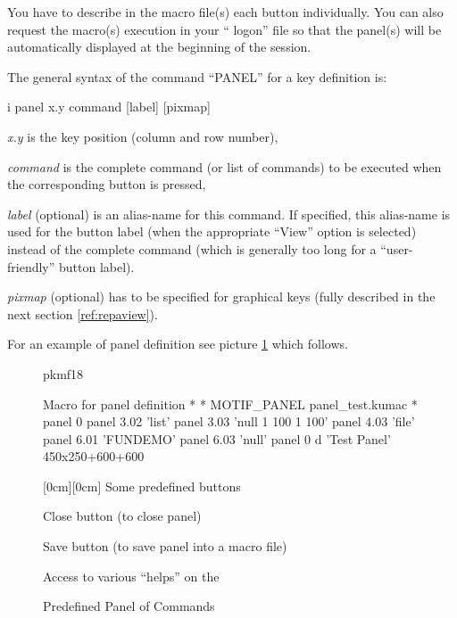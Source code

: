 You have to describe in the \KUIP{} macro file(s) each button
individually.  You can also request
the macro(s) execution in your ``\KUIP{} logon'' file
so that the panel(s) will be automatically displayed at the beginning
of the session.
 
The general syntax of the \KUIPMotif{} command ``PANEL''
for a key definition is:
 
\begin{Gray}{i}
 panel x.y command [label] [pixmap]
\end{Gray}
 
\begin{UL}
\item {\it x.y} is the key position (column and row number),
\item {\it command} is the complete command (or list of commands) to
be executed when the corresponding button is pressed,
\item  {\it label} (optional) is an alias-name for this command.
If specified, this alias-name is used for the button label
(when the appropriate ``View'' option is selected) instead of the
complete command (which is generally too long for a ``user-friendly''
button label).
\item {\it pixmap} (optional) has to be specified
for graphical keys (fully described in the next section \ref{ref:repaview}).
\end{UL}
 
For an example of panel definition see picture \ref{ref:FIGPKMF18}
which follows.
 
\begin{figure}[htb]
\begin{PICTf}[.45]{pkmf18}
\begin{DLsf}{}
\begin{XMPt}{\KUIP{} Macro for panel definition}\footnotesize
*
* MOTIF_PANEL panel_test.kumac
*
panel 0
panel 3.02 'list'
panel 3.03 'null 1 100 1 100'
panel 4.03 'file'
panel 6.01 'FUNDEMO'
panel 6.03 'null'
panel 0 d 'Test Panel' 450x250+600+600
\end{XMPt}
\end{DLsf}
\end{PICTf}
\begin{EnumZW}
\item \raisebox{-2pt}[0cm][0cm]{\Large{} }
Some predefined buttons
\end{EnumZW}
\begin{EnumZB}
\item Close button (to close panel)
\item Save button (to save panel into a \KUIP{} macro file)
\item Access to various ``helps''  on the \PNI{}
\vspace{-1\baselineskip}
\end{EnumZB}
\caption{Predefined Panel of Commands}
\label{ref:FIGPKMF18}
\end{figure}
 
